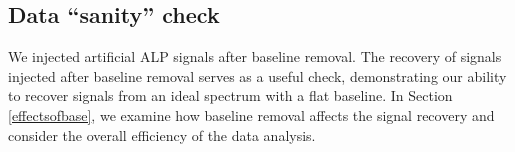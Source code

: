 \subsection{Data ``sanity'' check}\label{sec:recoverytest}
We injected artificial ALP signals after baseline removal. 
The recovery of signals injected after baseline removal serves as a useful check, demonstrating our ability to recover signals from an ideal spectrum with a flat baseline. 
In Section\,\ref{effectsofbase}, we examine how baseline removal affects the signal recovery and consider the overall efficiency of the data analysis.

